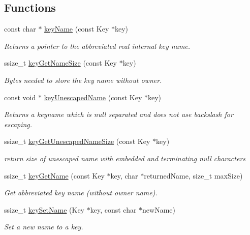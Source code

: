 \subsection*{Functions}
\begin{DoxyCompactItemize}
\item 
const char $\ast$ \mbox{\hyperlink{group__keyname_ga8e805c726a60da921d3736cda7813513}{key\+Name}} (const Key $\ast$key)
\begin{DoxyCompactList}\small\item\em Returns a pointer to the abbreviated real internal {\ttfamily key} name. \end{DoxyCompactList}\item 
ssize\+\_\+t \mbox{\hyperlink{group__keyname_gabdbcfa51ed8a387e47ead207affa2d2e}{key\+Get\+Name\+Size}} (const Key $\ast$key)
\begin{DoxyCompactList}\small\item\em Bytes needed to store the key name without owner. \end{DoxyCompactList}\item 
const void $\ast$ \mbox{\hyperlink{group__keyname_ga6fe6af4c27b35d911a533f4ae4d698bb}{key\+Unescaped\+Name}} (const Key $\ast$key)
\begin{DoxyCompactList}\small\item\em Returns a keyname which is null separated and does not use backslash for escaping. \end{DoxyCompactList}\item 
ssize\+\_\+t \mbox{\hyperlink{group__keyname_ga5e7eff0c77678420199d0d2e8729152b}{key\+Get\+Unescaped\+Name\+Size}} (const Key $\ast$key)
\begin{DoxyCompactList}\small\item\em return size of unescaped name with embedded and terminating null characters \end{DoxyCompactList}\item 
ssize\+\_\+t \mbox{\hyperlink{group__keyname_gab29a850168d9b31c9529e90cf9ab68be}{key\+Get\+Name}} (const Key $\ast$key, char $\ast$returned\+Name, size\+\_\+t max\+Size)
\begin{DoxyCompactList}\small\item\em Get abbreviated key name (without owner name). \end{DoxyCompactList}\item 
ssize\+\_\+t \mbox{\hyperlink{group__keyname_ga7699091610e7f3f43d2949514a4b35d9}{key\+Set\+Name}} (Key $\ast$key, const char $\ast$new\+Name)
\begin{DoxyCompactList}\small\item\em Set a new name to a key. \end{DoxyCompactList}\item 

\end{DoxyCompactItemize}
